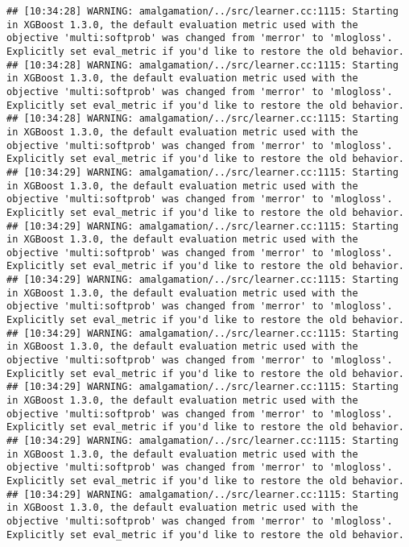 \documentclass[
]{scrbook}
\begin{document}
\begin{verbatim}
## [10:34:28] WARNING: amalgamation/../src/learner.cc:1115: Starting in XGBoost 1.3.0, the default evaluation metric used with the objective 'multi:softprob' was changed from 'merror' to 'mlogloss'. Explicitly set eval_metric if you'd like to restore the old behavior.
## [10:34:28] WARNING: amalgamation/../src/learner.cc:1115: Starting in XGBoost 1.3.0, the default evaluation metric used with the objective 'multi:softprob' was changed from 'merror' to 'mlogloss'. Explicitly set eval_metric if you'd like to restore the old behavior.
## [10:34:28] WARNING: amalgamation/../src/learner.cc:1115: Starting in XGBoost 1.3.0, the default evaluation metric used with the objective 'multi:softprob' was changed from 'merror' to 'mlogloss'. Explicitly set eval_metric if you'd like to restore the old behavior.
## [10:34:29] WARNING: amalgamation/../src/learner.cc:1115: Starting in XGBoost 1.3.0, the default evaluation metric used with the objective 'multi:softprob' was changed from 'merror' to 'mlogloss'. Explicitly set eval_metric if you'd like to restore the old behavior.
## [10:34:29] WARNING: amalgamation/../src/learner.cc:1115: Starting in XGBoost 1.3.0, the default evaluation metric used with the objective 'multi:softprob' was changed from 'merror' to 'mlogloss'. Explicitly set eval_metric if you'd like to restore the old behavior.
## [10:34:29] WARNING: amalgamation/../src/learner.cc:1115: Starting in XGBoost 1.3.0, the default evaluation metric used with the objective 'multi:softprob' was changed from 'merror' to 'mlogloss'. Explicitly set eval_metric if you'd like to restore the old behavior.
## [10:34:29] WARNING: amalgamation/../src/learner.cc:1115: Starting in XGBoost 1.3.0, the default evaluation metric used with the objective 'multi:softprob' was changed from 'merror' to 'mlogloss'. Explicitly set eval_metric if you'd like to restore the old behavior.
## [10:34:29] WARNING: amalgamation/../src/learner.cc:1115: Starting in XGBoost 1.3.0, the default evaluation metric used with the objective 'multi:softprob' was changed from 'merror' to 'mlogloss'. Explicitly set eval_metric if you'd like to restore the old behavior.
## [10:34:29] WARNING: amalgamation/../src/learner.cc:1115: Starting in XGBoost 1.3.0, the default evaluation metric used with the objective 'multi:softprob' was changed from 'merror' to 'mlogloss'. Explicitly set eval_metric if you'd like to restore the old behavior.
## [10:34:29] WARNING: amalgamation/../src/learner.cc:1115: Starting in XGBoost 1.3.0, the default evaluation metric used with the objective 'multi:softprob' was changed from 'merror' to 'mlogloss'. Explicitly set eval_metric if you'd like to restore the old behavior.

\end{verbatim}
\end{document}
